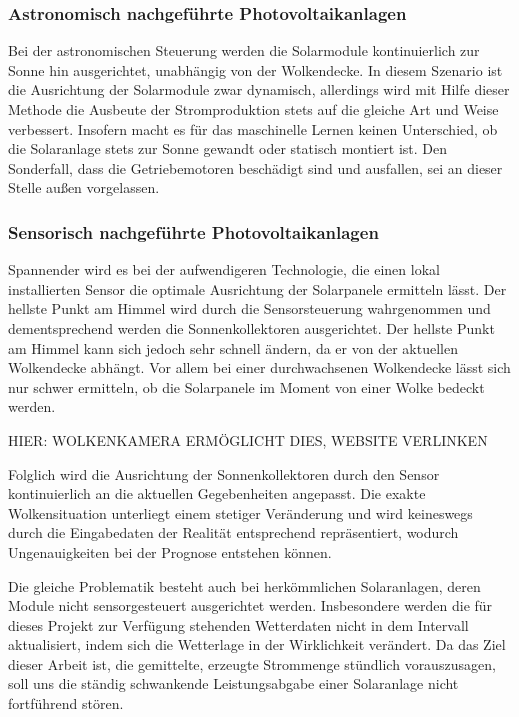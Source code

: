 \documentclass[12pt, a4paper]{article}
\begin{document}
\subsubsection{Astronomisch nachgeführte Photovoltaikanlagen}

Bei der astronomischen Steuerung werden die Solarmodule kontinuierlich zur Sonne hin ausgerichtet, unabhängig von der Wolkendecke. In diesem Szenario ist die Ausrichtung der Solarmodule zwar dynamisch, allerdings wird mit Hilfe dieser Methode die Ausbeute der Stromproduktion stets auf die gleiche Art und Weise verbessert. Insofern macht es für das maschinelle Lernen keinen Unterschied, ob die Solaranlage stets zur Sonne gewandt oder statisch montiert ist. Den Sonderfall, dass die Getriebemotoren beschädigt sind und ausfallen, sei an dieser Stelle außen vorgelassen.

\subsubsection{Sensorisch nachgeführte Photovoltaikanlagen}

Spannender wird es bei der aufwendigeren Technologie, die einen lokal installierten Sensor die optimale Ausrichtung der Solarpanele ermitteln lässt. Der hellste Punkt am Himmel wird durch die Sensorsteuerung wahrgenommen und dementsprechend werden die Sonnenkollektoren ausgerichtet. Der hellste Punkt am Himmel kann sich jedoch sehr schnell ändern, da er von der aktuellen Wolkendecke abhängt. Vor allem bei einer durchwachsenen Wolkendecke lässt sich nur schwer ermitteln, ob die Solarpanele im Moment von einer Wolke bedeckt werden. 

HIER: WOLKENKAMERA ERMÖGLICHT DIES, WEBSITE VERLINKEN

Folglich wird die Ausrichtung der Sonnenkollektoren durch den Sensor kontinuierlich an die aktuellen Gegebenheiten angepasst. Die exakte Wolkensituation unterliegt einem stetiger Veränderung und wird keineswegs durch die Eingabedaten der Realität entsprechend repräsentiert, wodurch Ungenauigkeiten bei der Prognose entstehen können.

Die gleiche Problematik besteht auch bei herkömmlichen Solaranlagen, deren Module nicht sensorgesteuert ausgerichtet werden. Insbesondere werden die für dieses Projekt zur Verfügung stehenden Wetterdaten  nicht in dem Intervall aktualisiert, indem sich die Wetterlage in der Wirklichkeit verändert. Da das Ziel dieser Arbeit ist, die gemittelte, erzeugte Strommenge stündlich vorauszusagen, soll uns die ständig schwankende Leistungsabgabe einer Solaranlage nicht fortführend stören. 
\end{document}
